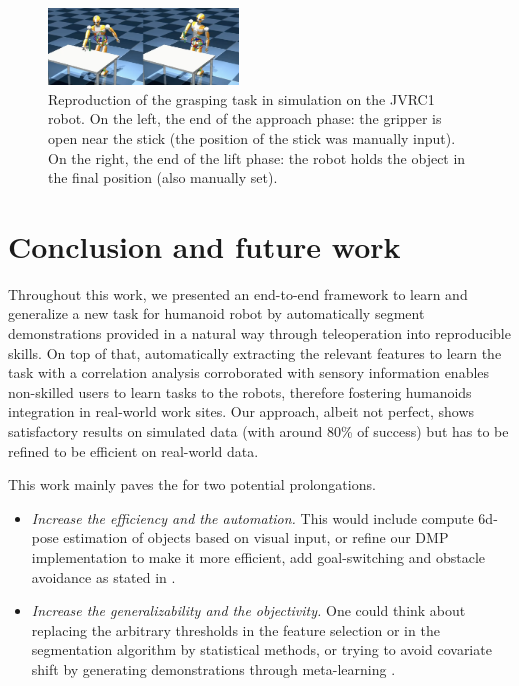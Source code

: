 \documentclass[conference]{IEEEtran}
\begin{document}
\begin{figure}[t]
  \centering
  \includegraphics[width=0.45\textwidth]{img/Reproduction.png}
  \caption{Reproduction of the grasping task in simulation on the JVRC1 robot. On the left, the end of the approach phase: the gripper is open near the stick (the position of the stick was manually input). On the right, the end of the lift phase: the robot holds the object in the final position (also manually set).}
  \label{fig:reproductionSim}
\end{figure}

\section{Conclusion and future work}\label{conclusion}

Throughout this work, we presented an end-to-end framework to learn and generalize a new task for humanoid robot by automatically segment demonstrations provided in a natural way through teleoperation into reproducible skills. 
On top of that, automatically extracting the relevant features to learn the task with a correlation analysis corroborated with sensory information enables non-skilled users to learn tasks to the robots, therefore fostering humanoids integration in real-world work sites. Our approach, albeit not perfect, shows satisfactory results on simulated data (with around 80\% of success) but has to be refined to be efficient on real-world data. \newline


This work mainly paves the for two potential prolongations.
\begin{itemize}
    \item \textit{Increase the efficiency and the automation.} This would include compute 6d-pose estimation of objects based on visual input, or refine our DMP implementation to make it more efficient, add goal-switching and obstacle avoidance as stated in \cite{saveriano_dynamic_2021}. 
    
    \item  \textit{Increase the generalizability and the objectivity.} One could think about replacing the arbitrary thresholds in the feature selection or in the segmentation algorithm by statistical methods, or trying to avoid covariate shift by generating demonstrations through meta-learning \cite{yu_one-shot_2018}.

\end{itemize}




\vspace{12pt}
\end{document}
